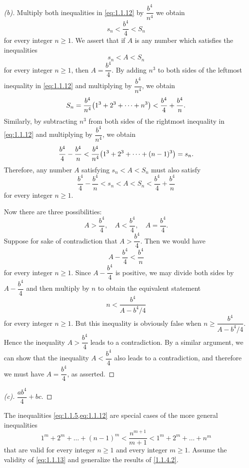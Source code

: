 \begin{proof}[(b)]
  Multiply both inequalities in \cref{eq:1.1.12} by \(\dfrac{b^4}{n^4}\) we obtain
  \[
    s_n < \dfrac{b^4}{4} < S_n
  \]
  for every integer \(n \geq 1\).
  We assert that if \(A\) is any number which satisfies the inequalities
  \[
    s_n < A < S_n
  \]
  for every integer \(n \geq 1\), then \(A = \dfrac{b^4}{4}\).
  By adding \(n^3\) to both sides of the leftmost inequality in \cref{eq:1.1.12} and multiplying by \(\dfrac{b^4}{n^4}\), we obtain
  \[
    S_n = \dfrac{b^4}{n^4} \pa{1^3 + 2^3 + \dots + n^3} < \dfrac{b^4}{4} + \dfrac{b^4}{n}.
  \]
  Similarly, by subtracting \(n^3\) from both sides of the rightmost inequality in \cref{eq:1.1.12} and multiplying by \(\dfrac{b^4}{n^4}\), we obtain
  \[
    \dfrac{b^4}{4} - \dfrac{b^4}{n} < \dfrac{b^4}{n^4} \pa{1^3 + 2^3 + \dots + (n - 1)^3} = s_n.
  \]
  Therefore, any number \(A\) satisfying \(s_n < A < S_n\) must also satisfy
  \[
    \dfrac{b^4}{4} - \dfrac{b^4}{n} < s_n < A < S_n < \dfrac{b^4}{4} + \dfrac{b^4}{n}
  \]
  for every integer \(n \geq 1\).

  Now there are three possibilities:
  \[
    A > \dfrac{b^4}{4}, \quad A < \dfrac{b^4}{4}, \quad A = \dfrac{b^4}{4}.
  \]
  Suppose for sake of contradiction that \(A > \dfrac{b^4}{4}\).
  Then we would have
  \[
    A - \dfrac{b^4}{4} < \dfrac{b^4}{n}
  \]
  for every integer \(n \geq 1\).
  Since \(A - \dfrac{b^4}{4}\) is positive, we may divide both sides by \(A - \dfrac{b^4}{4}\) and then multiply by \(n\) to obtain the equivalent statement
  \[
    n < \dfrac{b^4}{A - b^4 / 4}
  \]
  for every integer \(n \geq 1\).
  But this inequality is obviously false when \(n \geq \dfrac{b^4}{A - b^4 / 4}\).
  Hence the inequality \(A > \dfrac{b^4}{4}\) leads to a contradiction.
  By a similar argument, we can show that the inequality \(A < \dfrac{b^4}{4}\) also leads to a contradiction, and therefore we must have \(A = \dfrac{b^4}{4}\), as asserted.
\end{proof}

\begin{proof}[(c)]
  \(\dfrac{a b^4}{4} + bc\).
\end{proof}

\begin{ex}\label{1.1.4.3}
  The inequalities \cref{eq:1.1.5,eq:1.1.12} are special cases of the more general inequalities
  \begin{equation}\label{eq:1.1.13}
    1^m + 2^m + \dots + (n - 1)^m < \dfrac{n^{m + 1}}{m + 1} < 1^m + 2^m + \dots + n^m
  \end{equation}
  that are valid for every integer \(n \geq 1\) and every integer \(m \geq 1\).
  Assume the validity of \cref{eq:1.1.13} and generalize the results of \cref{1.1.4.2}.
\end{ex}

